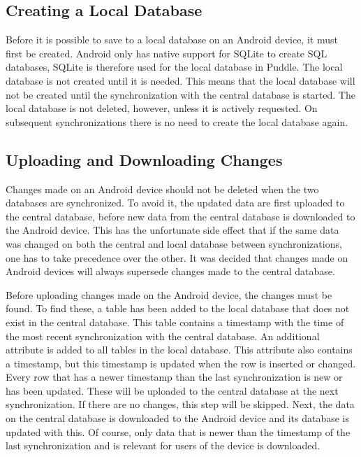 \subsection{Creating a Local Database}
Before it is possible to save to a local database on an Android device, it must first be created. Android only has native support for SQLite to create SQL databases, SQLite is therefore used for the local database in Puddle.
The local database is not created until it is needed. This means that the local database will not be created until the synchronization with the central database is started. The local database is not deleted, however, unless it is actively requested. On subsequent synchronizations there is no need to create the local database again.

\subsection{Uploading and Downloading Changes}
Changes made on an Android device should not be deleted when the two databases are synchronized. To avoid it, the updated data are first uploaded to the central database, before new data from the central database is downloaded to the Android device. This has the unfortunate side effect that if the same data was changed on both the central and local database between synchronizations, one has to take precedence over the other. It was decided that changes made on Android devices will always supersede changes made to the central database.

Before uploading changes made on the Android device, the changes must be found. To find these, a table has been added to the local database that does not exist in the central database. This table contains a timestamp with the time of the most recent synchronization with the central database. An additional attribute is added to all tables in the local database. This attribute also contains a timestamp, but this timestamp is updated when the row is inserted or changed. Every row that has a newer timestamp than the last synchronization is new or has been updated. These will be uploaded to the central database at the next synchronization. If there are no changes, this step will be skipped. Next, the data on the central database is downloaded to the Android device and its database is updated with this. Of course, only data that is newer than the timestamp of the last synchronization and is relevant for users of the device is downloaded.


